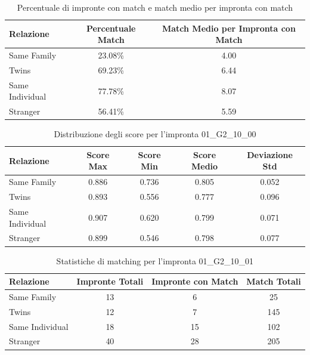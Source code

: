 \begin{table}[htbp]
\centering
\caption{Percentuale di impronte con match e match medio per impronta con match}
\label{tab:match_percentage_01_G2_10_00}
\begin{tabular}{|l|c|c|}
\hline
\textbf{Relazione} & \textbf{Percentuale Match} & \textbf{Match Medio per Impronta con Match} \\
\hline
Same Family & 23.08\% & 4.00 \\
\hline
Twins & 69.23\% & 6.44 \\
\hline
Same Individual & 77.78\% & 8.07 \\
\hline
Stranger & 56.41\% & 5.59 \\
\hline
\end{tabular}
\end{table}


\begin{table}[htbp]
\centering
\caption{Distribuzione degli score per l'impronta 01\_G2\_10\_00}
\label{tab:scores_01_G2_10_00}
\begin{tabular}{|l|c|c|c|c|}
\hline
\textbf{Relazione} & \textbf{Score Max} & \textbf{Score Min} & \textbf{Score Medio} & \textbf{Deviazione Std} \\
\hline
Same Family & 0.886 & 0.736 & 0.805 & 0.052 \\
\hline
Twins & 0.893 & 0.556 & 0.777 & 0.096 \\
\hline
Same Individual & 0.907 & 0.620 & 0.799 & 0.071 \\
\hline
Stranger & 0.899 & 0.546 & 0.798 & 0.077 \\
\hline
\end{tabular}
\end{table}


\begin{table}[htbp]
\centering
\caption{Statistiche di matching per l'impronta 01\_G2\_10\_01}
\label{tab:results_01_G2_10_01}
\begin{tabular}{|l|c|c|c|}
\hline
\textbf{Relazione} & \textbf{Impronte Totali} & \textbf{Impronte con Match} & \textbf{Match Totali} \\
\hline
Same Family & 13 & 6 & 25 \\
\hline
Twins & 12 & 7 & 145 \\
\hline
Same Individual & 18 & 15 & 102 \\
\hline
Stranger & 40 & 28 & 205 \\
\hline
\end{tabular}
\end{table}


